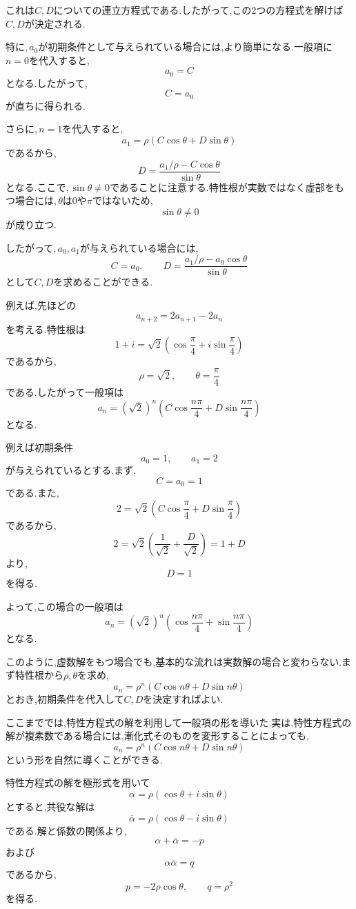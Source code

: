   これは$C,D$についての連立方程式である.したがって,この2つの方程式を解けば$C,D$が決定される.

  特に,\,$a_0$が初期条件として与えられている場合には,より簡単になる.一般項に$n=0$を代入すると,
  \[
    a_0=C
  \]
  となる.したがって,
  \[
    C=a_0
  \]
  が直ちに得られる.

  さらに,\,$n=1$を代入すると,
  \[
    a_1=\rho(C\cos\theta+D\sin\theta)
  \]
  であるから,
  \[
    D=
    \frac{a_1/\rho-C\cos\theta}{\sin\theta}
  \]
  となる.ここで,\,$\sin\theta\neq0$であることに注意する.特性根が実数ではなく虚部をもつ場合には,\,$\theta$は$0$や$\pi$ではないため,
  \[
    \sin\theta\neq0
  \]
  が成り立つ.

  したがって,\,$a_0,a_1$が与えられている場合には,
  \[
    C=a_0,\qquad
    D=\frac{a_1/\rho-a_0\cos\theta}{\sin\theta}
  \]
  として$C,D$を求めることができる.

  例えば,先ほどの
  \[
    a_{n+2}=2a_{n+1}-2a_n
  \]
  を考える.特性根は
  \[
    1+i
    =\sqrt{2}
    \left(
      \cos\frac{\pi}{4}
      +i\sin\frac{\pi}{4}
    \right)
  \]
  であるから,
  \[
    \rho=\sqrt{2},\qquad
    \theta=\frac{\pi}{4}
  \]
  である.したがって一般項は
  \[
    a_n=(\sqrt{2})^n
    \left(
      C\cos\frac{n\pi}{4}
      +D\sin\frac{n\pi}{4}
    \right)
  \]
  となる.

  例えば初期条件
  \[
    a_0=1,\qquad a_1=2
  \]
  が与えられているとする.まず,
  \[
    C=a_0=1
  \]
  である.また,
  \[
    2=\sqrt{2}
    \left(
      C\cos\frac{\pi}{4}
      +D\sin\frac{\pi}{4}
    \right)
  \]
  であるから,
  \[
    2=\sqrt{2}
    \left(
      \frac{1}{\sqrt{2}}
      +\frac{D}{\sqrt{2}}
    \right)
    =1+D
  \]
  より,
  \[
    D=1
  \]
  を得る.

  よって,この場合の一般項は
  \[
    a_n=(\sqrt{2})^n
    \left(
      \cos\frac{n\pi}{4}
      +\sin\frac{n\pi}{4}
    \right)
  \]
  となる.

  このように,虚数解をもつ場合でも,基本的な流れは実数解の場合と変わらない.まず特性根から$\rho,\theta$を求め,
  \[
    a_n=\rho^n(C\cos n\theta+D\sin n\theta)
  \]
  とおき,初期条件を代入して$C,D$を決定すればよい.

  ここまででは,特性方程式の解を利用して一般項の形を導いた.実は,特性方程式の解が複素数である場合には,漸化式そのものを変形することによっても,
  \[
    a_n=\rho^n(C\cos n\theta+D\sin n\theta)
  \]
  という形を自然に導くことができる.

  特性方程式の解を極形式を用いて
  \[
    \alpha=\rho(\cos\theta+i\sin\theta)
  \]
  とすると,共役な解は
  \[
    \overline{\alpha}
    =\rho(\cos\theta-i\sin\theta)
  \]
  である.解と係数の関係より,
  \[
    \alpha+\overline{\alpha}=-p
  \]
  および
  \[
    \alpha\overline{\alpha}=q
  \]
  であるから,
  \[
    p=-2\rho\cos\theta,\qquad
    q=\rho^2
  \]
  を得る.

